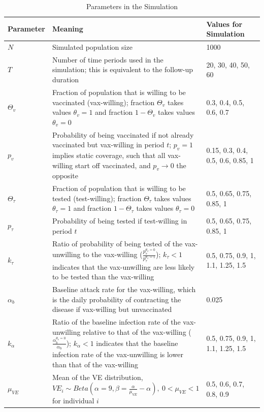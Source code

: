 \documentclass[12pt]{article}
\begin{document}
\begin{table}[H]
	\begin{center}
		\caption{Parameters in the Simulation}
		\begin{tabular}{||p{0.15\linewidth}| p{0.57\linewidth}|p{0.28\linewidth}||}
			\hline \hline
			\textbf{Parameter} & \textbf{Meaning} & \textbf{Values for Simulation} \\
			\hline \hline 
			$N$ & Simulated population size & 1000 \\
			\hline 
			$T$ & Number of time periods used in the simulation; this is equivalent to the follow-up duration & 20, 30, 40, 50, 60 \\
			\hline 
			$\Theta_{v}$ & Fraction of population that is willing to be vaccinated (vax-willing); fraction $\Theta_{v}$ takes values $\theta_{v} = 1$ and fraction $1 - \Theta_{v}$ takes values $\theta_{v} = 0$ & 0.3, 0.4, 0.5, 0.6, 0.7 \\
			\hline 
			$p_v$ & Probability of being vaccinated if not already vaccinated but vax-willing in period $t$; $p_v=1$ implies static coverage, such that all vax-willing start off vaccinated, and $p_v \rightarrow 0$ the opposite &  0.15, 0.3, 0.4, 0.5, 0.6, 0.85, 1 \\
			\hline 
			$\Theta_{\tau}$ & Fraction of population that is willing to be tested (test-willing); fraction $\Theta_{\tau}$ takes values $\theta_{\tau} = 1$ and fraction $1 - \Theta_{\tau}$ takes values $\theta_{\tau} = 0$ & 0.5, 0.65, 0.75, 0.85, 1 \\
			\hline 
			$p_\tau$ & Probability of being tested if test-willing in period $t$ & 0.5, 0.65, 0.75, 0.85, 1 \\
			\hline 
			$k_\tau$ & Ratio of probability of being tested of the vax-unwilling to the vax-willing ($\frac{p_\tau^{\theta_{v}=0}}{p_\tau^{\theta_{v}=1}}$); $k_\tau < 1$ indicates that the vax-unwilling are less likely to be tested than the vax-willing & 0.5, 0.75, 0.9, 1, 1.1, 1.25, 1.5 \\
			\hline 
			$\alpha_{b}$ & Baseline attack rate for the vax-willing, which is the daily probability of contracting the disease if vax-willing but unvaccinated & 0.025 \\
			\hline 
			$k_\alpha$ & Ratio of the baseline infection rate of the vax-unwilling relative to that of the vax-willing ($\frac{\alpha_{b}^{\theta_{v}=0}}{\alpha_{b}}$); $k_\alpha < 1$ indicates that the baseline infection rate of the vax-unwilling is lower than that of the vax-willing & 0.5, 0.75, 0.9, 1, 1.1, 1.25, 1.5 \\
			\hline 
			$\mu_{VE}$ & Mean of the VE distribution, ${VE}_{i} \sim Beta(\alpha=9,\beta=\frac{\alpha}{\mu_{VE}} - \alpha), \ 0 < \mu_{VE} < 1$ for individual $i$ & 0.5, 0.6, 0.7, 0.8, 0.9 \\
			\hline \hline
		\end{tabular}
	\end{center}
\end{table}
\end{document}
